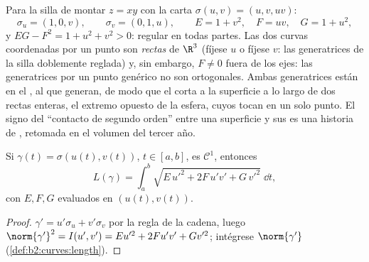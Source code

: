 \begin{example}\label{ex:b2:surfaces:saddlechart}
Para la silla de montar $z = xy$ con la carta $\sigma(u, v) = (u, v,
uv)$:
\[
\sigma_u = (1, 0, v), \qquad \sigma_v = (0, 1, u),
\qquad
E = 1 + v^2, \quad F = uv, \quad G = 1 + u^2 ,
\]
y $EG - F^2 = 1 + u^2 + v^2 > 0$: regular en todas partes. Las dos
curvas coordenadas por un punto son \emph{rectas} de $\R^3$ (fíjese
$u$ o fíjese $v$: las generatrices de la silla doblemente reglada) y,
sin embargo, $F \neq 0$ fuera de los ejes: las generatrices por un
punto genérico no son ortogonales. Ambas generatrices están en el
, al que generan, de modo que el 
corta a la superficie a lo largo de dos rectas enteras, el extremo
opuesto de la esfera, cuyos  tocan en un solo punto.
El signo del ``contacto de segundo orden'' entre una superficie y sus
 es una historia de , retomada en el
volumen del tercer año.
\end{example}

\begin{proposition}\label{prop:b2:surfaces:curvelength}
Si $\gamma(t) = \sigma(u(t), v(t))$, $t \in [a, b]$, es
$\mathcal{C}^1$, entonces
\[
L(\gamma) = \int_a^b
\sqrt{E\,u'^2 + 2F\,u'v' + G\,v'^2}\;\dd t ,
\]
con $E, F, G$ evaluados en $(u(t), v(t))$.
\end{proposition}

\begin{proof}
$\gamma' = u'\sigma_u + v'\sigma_v$ por la regla de la cadena, luego
$\norm{\gamma'}^2 = I(u', v') = Eu'^2 + 2Fu'v' + Gv'^2$; intégrese
$\norm{\gamma'}$ (\cref{def:b2:curves:length}).
\end{proof}

